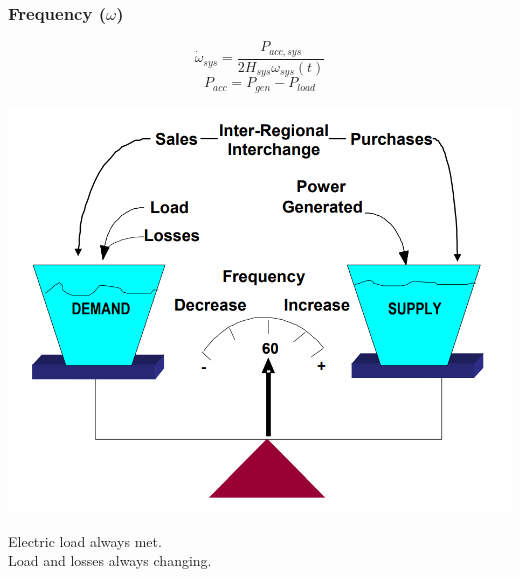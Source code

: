 \documentclass[14pt, unknownkeysallowed]{beamer}
\begin{document}
\begin{frame}
\frametitle{Frequency ($\omega$)}
\begin{minipage}[t][.55\textheight][t]{\textwidth}
	\begin{minipage}{.4\linewidth}
\vspace{-2em}
\[ \dot{\omega}_{sys} = \dfrac{P_{acc, sys}}{2H_{sys}\omega_{sys}(t) } \]
\[ P_{acc} = P_{gen} - P_{load} \]
	
\end{minipage}%
\begin{minipage}{.6\linewidth}
\vspace{-2em}
    \begin{center}
     \includegraphics[width=\linewidth]{freqScale}   {\tiny\cite{freqScale}}%
     \end{center}
\end{minipage}
\end{minipage}
Electric load always met.\\
\vspace{.5 em}
Load and losses always changing.
\end{frame}
\end{document}
